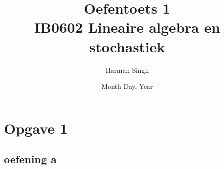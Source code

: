 \documentclass[11pt, a4paper]{article}
\title{Oefentoets 1 \\ IB0602 Lineaire algebra en stochastiek}
\author{Harman Singh}
\date{Month Day, Year}
\begin{document}
\maketitle

\pagebreak
\section*{Opgave 1}
\subsection*{oefening a}
\end{document}
